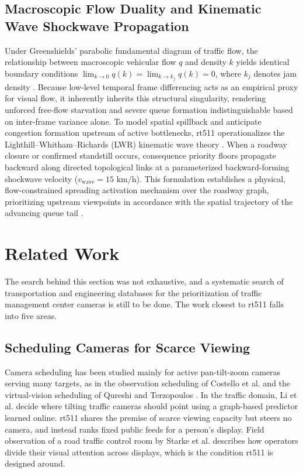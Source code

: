 \documentclass[10pt,journal,compsoc]{IEEEtran}
\begin{document}
\subsection{Macroscopic Flow Duality and Kinematic Wave Shockwave Propagation}
Under Greenshields' parabolic fundamental diagram of traffic flow, the relationship between macroscopic vehicular flow $q$ and density $k$ yields identical boundary conditions $\lim_{k \to 0} q(k) = \lim_{k \to k_j} q(k) = 0$, where $k_j$ denotes jam density \cite{greenshields1935}. Because low-level temporal frame differencing acts as an empirical proxy for visual flow, it inherently inherits this structural singularity, rendering unforced free-flow starvation and severe queue formation indistinguishable based on inter-frame variance alone. To model spatial spillback and anticipate congestion formation upstream of active bottlenecks, rt511 operationalizes the Lighthill--Whitham--Richards (LWR) kinematic wave theory \cite{lighthill1955, richards1956}. When a roadway closure or confirmed standstill occurs, consequence priority floors propagate backward along directed topological links at a parameterized backward-forming shockwave velocity ($v_{\text{wave}} = 15\text{ km/h}$). This formulation establishes a physical, flow-constrained spreading activation mechanism over the roadway graph, prioritizing upstream viewpoints in accordance with the spatial trajectory of the advancing queue tail \cite{collins1975, lighthill1955}.   

\section{Related Work}
\label{sec:related}
The search behind this section was not exhaustive, and a systematic search of transportation and engineering databases for the prioritization of traffic management center cameras is still to be done. The work closest to rt511 falls into five areas.

\subsection{Scheduling Cameras for Scarce Viewing}
Camera scheduling has been studied mainly for active pan-tilt-zoom cameras serving many targets, as in the observation scheduling of Costello et al. \cite{costello2004} and the virtual-vision scheduling of Qureshi and Terzopoulos \cite{qureshi2006}. In the traffic domain, Li et al. \cite{li2024} decide where tilting traffic cameras should point using a graph-based predictor learned online. rt511 shares the premise of scarce viewing capacity but steers no camera, and instead ranks fixed public feeds for a person's display. Field observation of a road traffic control room by Starke et al. \cite{starke2017} describes how operators divide their visual attention across displays, which is the condition rt511 is designed around.
\end{document}
